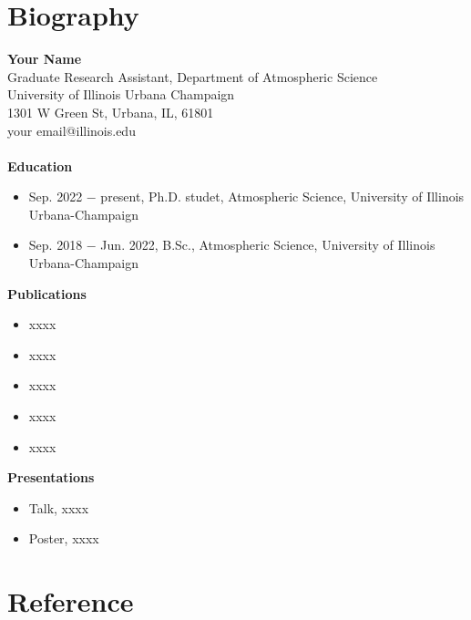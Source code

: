 \documentclass[11pt]{article} %
\begin{document}
\section{Biography}
\textbf{Your Name} \\
Graduate Research Assistant, Department of Atmospheric Science \\
University of Illinois Urbana Champaign \\
1301 W Green St, Urbana, IL, 61801 \\
your email@illinois.edu \\
\\
\noindent \textbf{Education} 
\begin{itemize}[leftmargin=0.2in, itemsep=-0.5em]
    \item Sep. 2022 $-$ present, Ph.D. studet, Atmospheric Science, University of Illinois Urbana-Champaign
    \item Sep. 2018 $-$ Jun. 2022, B.Sc., Atmospheric Science, University of Illinois Urbana-Champaign
\end{itemize} 

\noindent \textbf{Publications}
\begin{itemize}[leftmargin=0.2in, itemsep=-0.5em]
    \item xxxx 
    \item xxxx
    \item xxxx
    \item xxxx
    \item xxxx
\end{itemize}

\noindent \textbf{Presentations}
\begin{itemize}[leftmargin=0.2in, itemsep=-0.5em]
    \item Talk, xxxx
    \item Poster, xxxx
\end{itemize}

\newpage
\section{Reference}
\renewcommand{\bibsection}{}
\renewcommand{\bibfont}{\small}

\setlength{\bibsep}{0pt}

\end{document}
